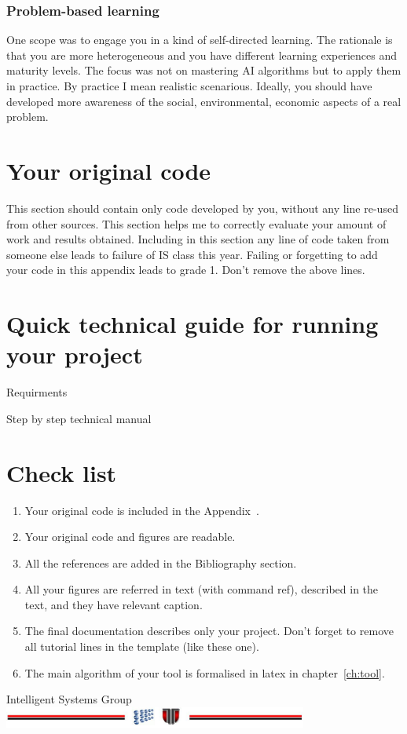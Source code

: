 \documentclass[a4paper,12pt]{report}
\begin{document}
\subsection{Problem-based learning}

One scope was to engage you in a kind of self-directed learning.
The rationale is that you are more heterogeneous and 
you have different learning experiences and maturity levels.
The focus was not on mastering AI algorithms but to apply them in practice. 
By practice I mean realistic scenarious.
Ideally, you should have developed more awareness of the social, 
environmental, economic aspects of a real problem. 


\appendix

\chapter{Your original code}
\label{app:code}
This section should contain only code developed by you, without any line re-used from other sources. 
This section helps me to correctly evaluate your amount of work and results obtained. 
Including in this section any line of code taken from someone else leads to failure of IS class this year.
Failing or forgetting to add your code in this appendix leads to grade 1.
Don't remove the above lines.




\chapter{Quick technical guide for running your project}

Requirments

Step by step technical manual

%

\chapter{Check list}

\begin{enumerate}
 \item Your original code is included in the Appendix~\label{app:code}.
 \item Your original code and figures are readable.
 \item All the references are added in the Bibliography section.
  \item All your figures are referred in text (with command ref{}), described in the text, and they have relevant caption.
 \item The final documentation describes only your project. Don't forget to remove all tutorial lines in the template (like these one).
 \item The main algorithm of your tool is formalised in latex in chapter~\ref{ch:tool}.
  
\end{enumerate}






\vspace{2cm}
\begin{center}
Intelligent Systems Group\\
\includegraphics[width=10cm]{fig/footer}
\end{center}
\end{document}
